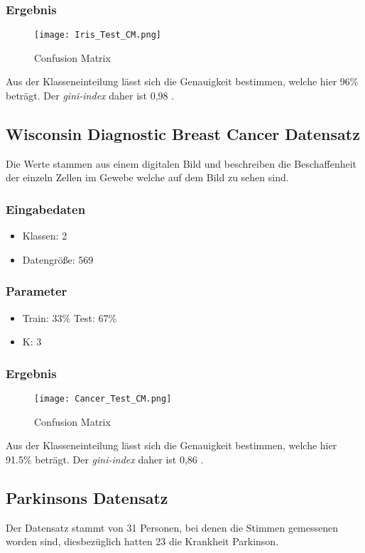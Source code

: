 \subsubsection{Ergebnis}
\begin{figure}[H]
\texttt{[image: Iris\_Test\_CM.png]}
\caption{Confusion Matrix}
\label{}
\end{figure}

Aus der Klasseneinteilung lässt sich die Genauigkeit bestimmen, welche hier 96\% beträgt. Der \textit{gini-index} daher ist 0,98 .

\subsection{Wisconsin Diagnostic Breast Cancer Datensatz}
Die Werte stammen aus einem digitalen Bild und beschreiben die Beschaffenheit der einzeln Zellen im Gewebe welche auf dem Bild zu sehen sind. \cite{uci}
\subsubsection{Eingabedaten}
\begin{itemize}
	\item Klassen: 2
	\item Datengröße: 569
\end{itemize}
\subsubsection{Parameter}
\begin{itemize}
	\item Train: 33\% Test: 67\%
	\item K: 3 
\end{itemize}
\subsubsection{Ergebnis}
\begin{figure}[H]
\texttt{[image: Cancer\_Test\_CM.png]}
\caption{Confusion Matrix}
\end{figure}

Aus der Klasseneinteilung lässt sich die Genauigkeit bestimmen, welche hier 91.5\% beträgt. Der \textit{gini-index} daher ist 0,86 .

\subsection{Parkinsons Datensatz}
Der Datensatz stammt von 31 Personen, bei denen die Stimmen gemessenen worden sind, diesbezüglich hatten 23 die Krankheit Parkinson. \cite{uci}

